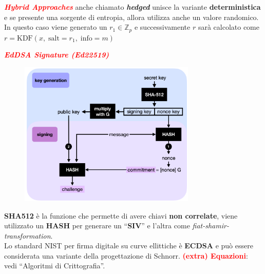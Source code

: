 \begin{flushleft}
    \smallskip

    \textcolor{red}{\textbf{\textit{Hybrid Approaches}}} anche chiamato \textbf{\textit{hedged}} unisce la variante \textbf{deterministica} e se presente una sorgente di entropia, allora utilizza anche un valore randomico. In questo caso viene generato un $r_1 \in \mathbb{Z}_p$ e successivamente $r$ sarà calcolato come $r = \text{KDF}(x, \; \text{salt}=r_1, \; \text{info}=m)$

    \medskip

    \textcolor{red}{\textbf{\textit{EdDSA Signature (Ed22519)}}}

    \begin{figure}[h]
        \centering
        \includegraphics[width=0.75\textwidth]{img/eddsa.png}
    \end{figure}

    \textbf{SHA512} è la funzione che permette di avere chiavi \textbf{non correlate}, viene utilizzato un \textbf{HASH} per generare un ``\textbf{SIV}'' e l'altra come \textit{fiat-shamir-transformation}. \\
    Lo standard NIST per firma digitale su curve ellittiche è \textbf{ECDSA} e può essere considerata una variante della progettazione di Schnorr. \textcolor{red}{\textbf{(extra) Equazioni}}: vedi ``Algoritmi di Crittografia''.

\end{flushleft}

